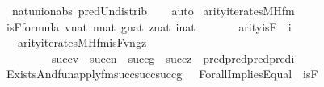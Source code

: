 \begin{isabellebody}
\ \ \ \ nat{\isacharunderscore}{\kern0pt}union{\isacharunderscore}{\kern0pt}abs{}\ pred{\isacharunderscore}{\kern0pt}Un{\isacharunderscore}{\kern0pt}distrib\isanewline
\ \ \isamarkupfalse%
\ auto%
\endisatagproof
{\isafoldproof}%
%
\isadelimproof
\isanewline
%
\endisadelimproof
\isanewline
{}\isamarkupfalse%
\ arity{\isacharunderscore}{\kern0pt}iterates{\isacharunderscore}{\kern0pt}MH{\isacharunderscore}{\kern0pt}fm\ {\isacharcolon}{\kern0pt}\isanewline
\ \ \ {\isachardoublequoteopen}isF{\isasymin}formula{\isachardoublequoteclose}\ {\isachardoublequoteopen}v{\isasymin}nat{\isachardoublequoteclose}\ {\isachardoublequoteopen}n{\isasymin}nat{\isachardoublequoteclose}\ {\isachardoublequoteopen}g{\isasymin}nat{\isachardoublequoteclose}\ {\isachardoublequoteopen}z{\isasymin}nat{\isachardoublequoteclose}\ {\isachardoublequoteopen}i{\isasymin}nat{\isachardoublequoteclose}\ \isanewline
\ \ \ \ \ \ {\isachardoublequoteopen}arity{\isacharparenleft}{\kern0pt}isF{\isacharparenright}{\kern0pt}\ {\isacharequal}{\kern0pt}\ i{\isachardoublequoteclose}\isanewline
\ \ \ \ \ {\isachardoublequoteopen}arity{\isacharparenleft}{\kern0pt}iterates{\isacharunderscore}{\kern0pt}MH{\isacharunderscore}{\kern0pt}fm{\isacharparenleft}{\kern0pt}isF{\isacharcomma}{\kern0pt}v{\isacharcomma}{\kern0pt}n{\isacharcomma}{\kern0pt}g{\isacharcomma}{\kern0pt}z{\isacharparenright}{\kern0pt}{\isacharparenright}{\kern0pt}\ {\isacharequal}{\kern0pt}\ \isanewline
\ \ \ \ \ \ \ \ \ \ \ succ{\isacharparenleft}{\kern0pt}v{\isacharparenright}{\kern0pt}\ {\isasymunion}\ succ{\isacharparenleft}{\kern0pt}n{\isacharparenright}{\kern0pt}\ {\isasymunion}\ succ{\isacharparenleft}{\kern0pt}g{\isacharparenright}{\kern0pt}\ {\isasymunion}\ succ{\isacharparenleft}{\kern0pt}z{\isacharparenright}{\kern0pt}\ {\isasymunion}\ pred{\isacharparenleft}{\kern0pt}pred{\isacharparenleft}{\kern0pt}pred{\isacharparenleft}{\kern0pt}pred{\isacharparenleft}{\kern0pt}i{\isacharparenright}{\kern0pt}{\isacharparenright}{\kern0pt}{\isacharparenright}{\kern0pt}{\isacharparenright}{\kern0pt}{\isachardoublequoteclose}\isanewline
%
\isadelimproof
%
\endisadelimproof
%
\isatagproof
{}\isamarkupfalse%
\ {\isacharminus}{\kern0pt}\isanewline
\ \ \isamarkupfalse%
\ {\isacharquery}{\kern0pt}{\isasymphi}\ {\isacharequal}{\kern0pt}\ {\isachardoublequoteopen}Exists{\isacharparenleft}{\kern0pt}And{\isacharparenleft}{\kern0pt}fun{\isacharunderscore}{\kern0pt}apply{\isacharunderscore}{\kern0pt}fm{\isacharparenleft}{\kern0pt}succ{\isacharparenleft}{\kern0pt}succ{\isacharparenleft}{\kern0pt}succ{\isacharparenleft}{\kern0pt}g{\isacharparenright}{\kern0pt}{\isacharparenright}{\kern0pt}{\isacharparenright}{\kern0pt}{\isacharcomma}{\kern0pt}\ {}{\isacharcomma}{\kern0pt}\ {}{\isacharparenright}{\kern0pt}{\isacharcomma}{\kern0pt}\ Forall{\isacharparenleft}{\kern0pt}Implies{\isacharparenleft}{\kern0pt}Equal{\isacharparenleft}{\kern0pt}{}{\isacharcomma}{\kern0pt}\ {}{\isacharparenright}{\kern0pt}{\isacharcomma}{\kern0pt}\ isF{\isacharparenright}{\kern0pt}{\isacharparenright}{\kern0pt}{\isacharparenright}{\kern0pt}{\isacharparenright}{\kern0pt}{\isachardoublequoteclose}\isanewline

\end{isabellebody}
